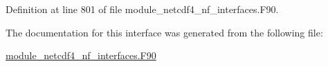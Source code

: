 Definition at line 801 of file module\+\_\+netcdf4\+\_\+nf\+\_\+interfaces.\+F90.



The documentation for this interface was generated from the following file\+:\begin{DoxyCompactItemize}
\item 
\hyperlink{module__netcdf4__nf__interfaces_8F90}{module\+\_\+netcdf4\+\_\+nf\+\_\+interfaces.\+F90}\end{DoxyCompactItemize}
